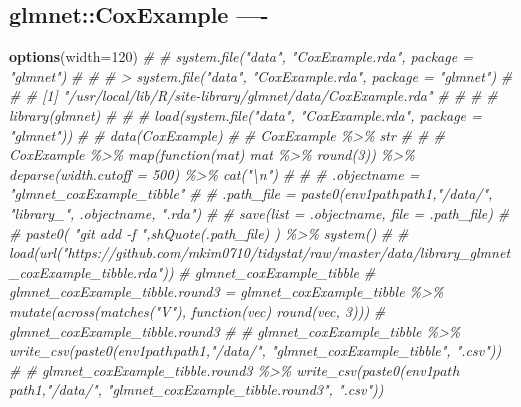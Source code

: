 \documentclass[
]{article}
\newenvironment{Shaded}{\begin{snugshade}}{\end{snugshade}}
\newcommand{\AttributeTok}[1]{\textcolor[rgb]{0.13,0.29,0.53}{#1}}
\newcommand{\CommentTok}[1]{\textcolor[rgb]{0.56,0.35,0.01}{\textit{#1}}}
\newcommand{\DecValTok}[1]{\textcolor[rgb]{0.00,0.00,0.81}{#1}}
\newcommand{\FunctionTok}[1]{\textcolor[rgb]{0.13,0.29,0.53}{\textbf{#1}}}
\newcommand{\NormalTok}[1]{#1}
\begin{document}
\hypertarget{glmnetcoxexample--}{%
\subsection{glmnet::CoxExample ----}\label{glmnetcoxexample--}}

\begin{Shaded}
\begin{Highlighting}[]
\FunctionTok{options}\NormalTok{(}\AttributeTok{width=}\DecValTok{120}\NormalTok{)}
\CommentTok{\# \# system.file("data", "CoxExample.rda", package = "glmnet")}
\CommentTok{\# \# \# \textgreater{} system.file("data", "CoxExample.rda", package = "glmnet")}
\CommentTok{\# \# \# [1] "/usr/local/lib/R/site{-}library/glmnet/data/CoxExample.rda"}
\CommentTok{\# \# }
\CommentTok{\# \# library(glmnet)}
\CommentTok{\# \# \# load(system.file("data", "CoxExample.rda", package = "glmnet"))}
\CommentTok{\# \# data(CoxExample)}
\CommentTok{\# \# CoxExample \%\textgreater{}\% str}
\CommentTok{\# \# \# CoxExample \%\textgreater{}\% map(function(mat) mat \%\textgreater{}\% round(3)) \%\textgreater{}\% deparse(width.cutoff = 500) \%\textgreater{}\% cat("\textbackslash{}n")}
\CommentTok{\# }
\CommentTok{\# \# .objectname = "glmnet\_coxExample\_tibble"}
\CommentTok{\# \# .path\_file = paste0(env1$path$path1,"/data/", "library\_", .objectname, ".rda")}
\CommentTok{\# \# save(list = .objectname, file = .path\_file)}
\CommentTok{\# \# paste0( "git add {-}f ",shQuote(.path\_file) ) \%\textgreater{}\% system()}
\CommentTok{\# }
\CommentTok{\# load(url("https://github.com/mkim0710/tidystat/raw/master/data/library\_glmnet\_coxExample\_tibble.rda"))}
\CommentTok{\# glmnet\_coxExample\_tibble}
\CommentTok{\# glmnet\_coxExample\_tibble.round3 = glmnet\_coxExample\_tibble \%\textgreater{}\% mutate(across(matches("V"), function(vec) round(vec, 3)))}
\CommentTok{\# glmnet\_coxExample\_tibble.round3}
\CommentTok{\# \# glmnet\_coxExample\_tibble \%\textgreater{}\% write\_csv(paste0(env1$path$path1,"/data/", "glmnet\_coxExample\_tibble", ".csv"))}
\CommentTok{\# \# glmnet\_coxExample\_tibble.round3 \%\textgreater{}\% write\_csv(paste0(env1$path$path1,"/data/", "glmnet\_coxExample\_tibble.round3", ".csv"))}
\end{Highlighting}
\end{Shaded}
\end{document}
